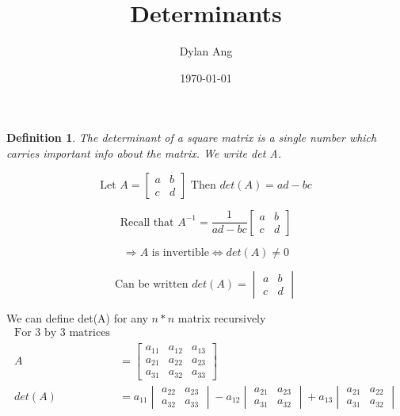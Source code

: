 \documentclass[12pt]{amsart}
\title{Determinants}
\author{Dylan Ang}
\date{\today}
\newtheorem{definition}{Definition} %
\numberwithin{equation}{theorem}    %
\begin{document}
\maketitle

\tableofcontents

\begin{definition}
    The determinant of a square matrix is a single number which carries important info about the matrix. We write det A.
\end{definition}

\begin{equation}
    \text{Let } A =
    \begin{bmatrix}
        a & b \\
        c & d
    \end{bmatrix}
    \text{ Then } det(A)=ad-bc
\end{equation}

$$\text{Recall that }A^{-1}=\frac{1}{ad-bc}
    \begin{bmatrix}
        a & b \\
        c & d
    \end{bmatrix}$$

$$\Rightarrow A \text{ is invertible} \Leftrightarrow det(A) \neq 0$$

$$\text{Can be written } det(A) =
    \begin{vmatrix}
        a & b \\
        c & d
    \end{vmatrix}$$

We can define det(A) for any $n*n$ matrix recursively
\begin{align} \label{formula:determinant}
    \text{For 3 by 3 matrices}           \\
    A      & = \begin{bmatrix}
        a_{1 1} & a_{1 2} & a_{1 3} \\
        a_{2 1} & a_{2 2} & a_{2 3} \\
        a_{3 1} & a_{3 2} & a_{3 3}
    \end{bmatrix} \\
    det(A) & =
    a_{1 1}
    \begin{vmatrix}
        a_{2 2} & a_{2 3} \\
        a_{3 2} & a_{3 3}
    \end{vmatrix}
    - a_{1 2}
    \begin{vmatrix}
        a_{2 1} & a_{2 3} \\
        a_{3 1} & a_{3 2}
    \end{vmatrix}
    + a_{1 3}
    \begin{vmatrix}
        a_{2 1} & a_{2 2} \\
        a_{3 1} & a_{3 2}
    \end{vmatrix}
\end{align}
\end{document}
